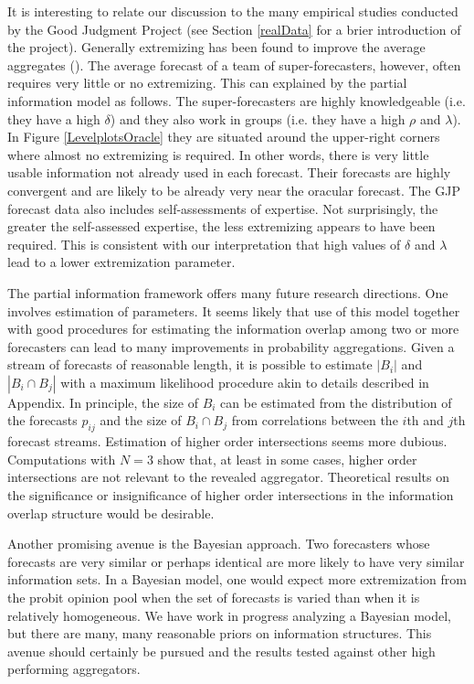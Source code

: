 \documentclass[11pt]{article}
\theoremstyle{definition}
\theoremstyle{definition}
\begin{document}
It is interesting to relate our discussion to the many empirical
studies conducted by the Good Judgment Project (see Section
\ref{realData} for a brier introduction of the project).  Generally
extremizing has been found to improve the average aggregates
(\citealt{mellers2014psychological, satopaa, satopaa2014probability}).
The average forecast of a team of super-forecasters, however, often
requires very little or no extremizing.  This can explained by the
partial information model as follows.  The super-forecasters are
highly knowledgeable (i.e. they have a high $\delta$) and they also
work in groups (i.e. they have a high $\rho$ and $\lambda$).  In
Figure \ref{LevelplotsOracle} they are situated around the upper-right
corners where almost no extremizing is required.  In other words,
there is very little usable information not already used in each
forecast.  Their forecasts are highly convergent and are likely to be
already very near the oracular forecast.  The GJP forecast data also
includes self-assessments of expertise.  Not surprisingly, the greater
the self-assessed expertise, the less extremizing appears to have been
required.  This is consistent with our interpretation that high values
of $\delta$ and $\lambda$ lead to a lower extremization parameter.

The partial information framework offers many future research
directions.  One involves estimation of parameters.  It seems likely
that use of this model together with good procedures for estimating
the information overlap among two or more forecasters can lead to many
improvements in probability aggregations. Given a stream of forecasts
of reasonable length, it is possible to estimate $|B_i|$ and $|B_i
\cap B_j|$ with a maximum likelihood procedure akin to details
described in Appendix. In principle, the size of $B_i$ can be
estimated from the distribution of the forecasts $p_{ij}$ and the size
of $B_i \cap B_j$ from correlations between the $i$th and $j$th
forecast streams.  Estimation of higher order intersections seems more
dubious.  Computations with $N=3$ show that, at least in some cases,
higher order intersections are not relevant to the revealed
aggregator.  Theoretical results on the significance or insignificance
of higher order intersections in the information overlap structure
would be desirable.

Another promising avenue is the Bayesian approach.  Two forecasters
whose forecasts are very similar or perhaps identical are more likely
to have very similar information sets.  In a Bayesian model, one would
expect more extremization from the probit opinion pool when the set of
forecasts is varied than when it is relatively homogeneous.  We have
work in progress analyzing a Bayesian model, but there are many, many
reasonable priors on information structures.  This avenue should
certainly be pursued and the results tested against other high
performing aggregators.
\end{document}
